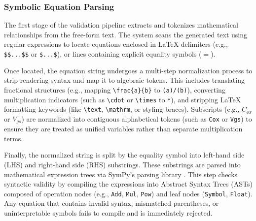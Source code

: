 \documentclass[a4paper,fleqn]{cas-sc}
\begin{document}
\subsubsection{Symbolic Equation Parsing}
\label{subsec:equation_extraction}
The first stage of the validation pipeline extracts and tokenizes mathematical relationships from the free-form text. The system scans the generated text using regular expressions to locate equations enclosed in LaTeX delimiters (e.g., \verb|$$...$$| or \verb|$...$|), or lines containing explicit equality symbols ($=$).

Once located, the equation string undergoes a multi-step normalization process to strip rendering syntax and map it to algebraic tokens. This includes translating fractional structures
(e.g., mapping \verb|\frac{a}{b}| to \verb|(a)/(b)|), converting multiplication indicators
(such as \verb|\cdot| or \verb|\times| to \verb|*|), and stripping LaTeX formatting keywords
(like \verb|\text|, \verb|\mathrm|, or styling braces). Subscripts (e.g., $C_{ox}$ or $V_{gs}$)
are normalized into contiguous alphabetical tokens (such as \texttt{Cox} or \texttt{Vgs}) to
ensure they are treated as unified variables rather than separate multiplication terms.

Finally, the normalized string is split by the equality symbol into left-hand side (LHS) and
right-hand side (RHS) substrings. These substrings are parsed into mathematical expression trees via SymPy's parsing library \citep{sympy}. This step checks syntactic validity by compiling the expressions into Abstract Syntax Trees (ASTs) composed of operation nodes (e.g., \texttt{Add}, \texttt{Mul},
\texttt{Pow}) and leaf nodes (\texttt{Symbol}, \texttt{Float}). Any equation that contains
invalid syntax, mismatched parentheses, or uninterpretable symbols fails to compile and is
immediately rejected.
\end{document}
